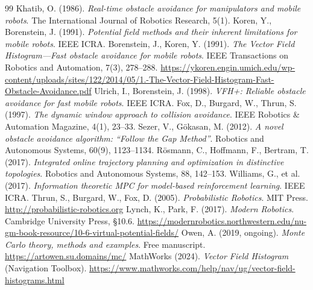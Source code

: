 
\label{sec:bibliography}

\begin{thebibliography}{99}
 Khatib, O. (1986). \emph{Real-time obstacle avoidance
for manipulators and mobile robots}. The International Journal of Robotics
Research, 5(1).
 Koren, Y., Borenstein, J. (1991). \emph{Potential field
methods and their inherent limitations for mobile robots}. IEEE ICRA.
 Borenstein, J., Koren, Y. (1991). \emph{The Vector
Field Histogram---Fast obstacle avoidance for mobile robots}. IEEE
Transactions on Robotics and Automation, 7(3), 278--288.
\url{https://ykoren.engin.umich.edu/wp-content/uploads/sites/122/2014/05/1.-The-Vector-Field-Histogram-Fast-Obstacle-Avoidance.pdf}
 Ulrich, I., Borenstein, J. (1998). \emph{VFH+: Reliable
obstacle avoidance for fast mobile robots}. IEEE ICRA.
 Fox, D., Burgard, W., Thrun, S. (1997). \emph{The dynamic
window approach to collision avoidance}. IEEE Robotics \& Automation
Magazine, 4(1), 23--33.
 Sezer, V., G\"okasan, M. (2012). \emph{A novel obstacle
avoidance algorithm: ``Follow the Gap Method''}. Robotics and Autonomous
Systems, 60(9), 1123--1134.
 R\"osmann, C., Hoffmann, F., Bertram, T. (2017).
\emph{Integrated online trajectory planning and optimization in distinctive
topologies}. Robotics and Autonomous Systems, 88, 142--153.
 Williams, G., et al. (2017). \emph{Information
theoretic MPC for model-based reinforcement learning}. IEEE ICRA.
 Thrun, S., Burgard, W., Fox, D. (2005). \emph{Probabilistic
Robotics}. MIT Press. \url{http://probabilistic-robotics.org}
 Lynch, K., Park, F. (2017). \emph{Modern Robotics}.
Cambridge University Press, \S10.6.
\url{https://modernrobotics.northwestern.edu/nu-gm-book-resource/10-6-virtual-potential-fields/}
 Owen, A. (2019, ongoing). \emph{Monte Carlo theory,
methods and examples}. Free manuscript.
\url{https://artowen.su.domains/mc/}
 MathWorks (2024). \emph{Vector Field Histogram} (Navigation
Toolbox).
\url{https://www.mathworks.com/help/nav/ug/vector-field-histograms.html}

\end{thebibliography}
